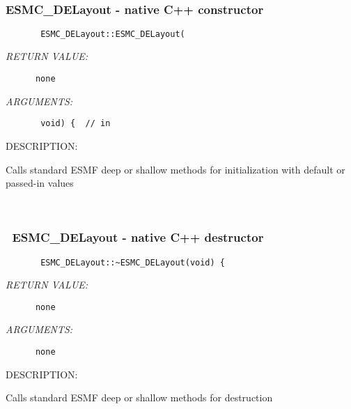  
\mbox{}\hrulefill\ 
 
\subsubsection{ESMC\_DELayout - native C++ constructor}


  
\begin{verbatim}       ESMC_DELayout::ESMC_DELayout(\end{verbatim}{\em RETURN VALUE:}
\begin{verbatim}      none\end{verbatim}{\em ARGUMENTS:}
\begin{verbatim}       void) {  // in\end{verbatim}
{\sf DESCRIPTION:\\ }


        Calls standard ESMF deep or shallow methods for initialization
        with default or passed-in values
   
 
\mbox{}\hrulefill\ 
 
\subsubsection{~ESMC\_DELayout - native C++ destructor}


  
\begin{verbatim}       ESMC_DELayout::~ESMC_DELayout(void) {\end{verbatim}{\em RETURN VALUE:}
\begin{verbatim}      none\end{verbatim}{\em ARGUMENTS:}
\begin{verbatim}      none\end{verbatim}
{\sf DESCRIPTION:\\ }


        Calls standard ESMF deep or shallow methods for destruction
  
